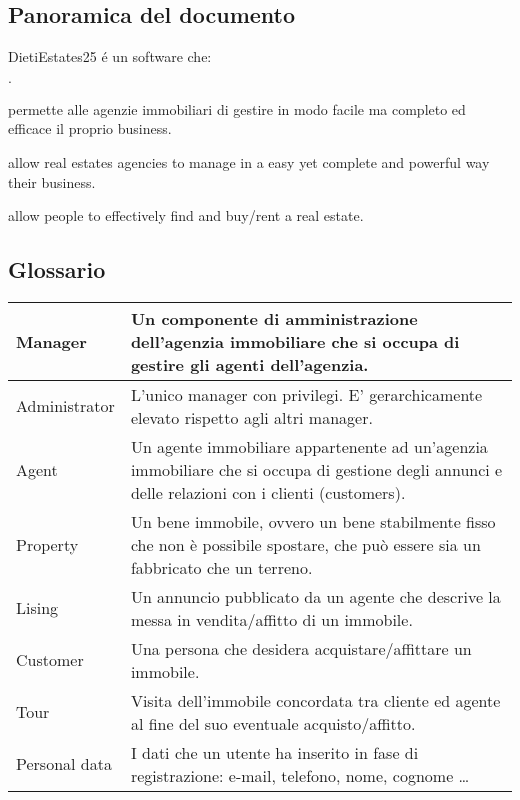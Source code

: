 \subsection{Panoramica del documento}
DietiEstates25 é un software che:
\begin{list}{$\cdot$}{}
    \item permette alle agenzie immobiliari di gestire in modo facile
    ma completo ed efficace il proprio business.
    \item allow real estates agencies to manage in a easy yet 
    complete and powerful way their business.
    \item allow people to effectively find and buy/rent a 
    real estate.
\end{list}

\subsection{Glossario}
\begin{center}
\begin{tabular}{| m{8em} | m{8cm}|}
    \hline
    Manager & Un componente di amministrazione dell'agenzia immobiliare 
    che si occupa di gestire gli agenti dell'agenzia. \\
    \hline
    Administrator & L'unico manager con privilegi. E' gerarchicamente 
    elevato rispetto agli altri manager.
    \\
    \hline
    Agent & Un agente immobiliare appartenente ad un'agenzia immobiliare 
    che si occupa di gestione degli annunci e delle relazioni con i clienti (customers). \\
    \hline
    Property & Un bene immobile, ovvero un bene stabilmente fisso che non è 
    possibile spostare, che può essere sia un fabbricato che un terreno.\\
    \hline
    Lising & Un annuncio pubblicato da un agente che descrive la messa in 
    vendita/affitto di un immobile. \\
    \hline
    Customer & Una persona che desidera acquistare/affittare un immobile.\\
    \hline
    Tour & Visita dell'immobile concordata tra cliente ed agente al fine del 
    suo eventuale acquisto/affitto.\\
    \hline
    Personal data & I dati che un utente ha inserito in fase di registrazione: 
    e-mail, telefono, nome, cognome \dots \\
    \hline

\end{tabular}
\end{center}
